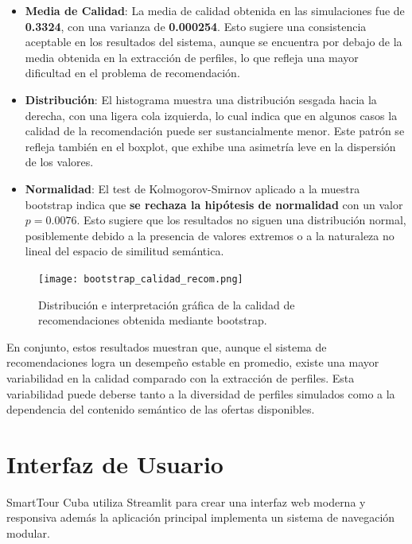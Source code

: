\documentclass[runningheads]{llncs}
\begin{document}
\begin{itemize}
    \item \textbf{Media de Calidad}: La media de calidad obtenida en las simulaciones fue de \textbf{0.3324}, con una varianza de \textbf{0.000254}. Esto sugiere una consistencia aceptable en los resultados del sistema, aunque se encuentra por debajo de la media obtenida en la extracción de perfiles, lo que refleja una mayor dificultad en el problema de recomendación.
    
    \item \textbf{Distribución}: El histograma muestra una distribución sesgada hacia la derecha, con una ligera cola izquierda, lo cual indica que en algunos casos la calidad de la recomendación puede ser sustancialmente menor. Este patrón se refleja también en el boxplot, que exhibe una asimetría leve en la dispersión de los valores.
    
    \item \textbf{Normalidad}: El test de Kolmogorov-Smirnov aplicado a la muestra bootstrap indica que \textbf{se rechaza la hipótesis de normalidad} con un valor $p = 0.0076$. Esto sugiere que los resultados no siguen una distribución normal, posiblemente debido a la presencia de valores extremos o a la naturaleza no lineal del espacio de similitud semántica.

\end{itemize}

\begin{figure}[H]
    \centering
    \texttt{[image: bootstrap\_calidad\_recom.png]}
    \caption{Distribución e interpretación gráfica de la calidad de recomendaciones obtenida mediante bootstrap.}
    \label{fig:bootstrap-recomendaciones}
\end{figure}

En conjunto, estos resultados muestran que, aunque el sistema de recomendaciones logra un desempeño estable en promedio, existe una mayor variabilidad en la calidad comparado con la extracción de perfiles. Esta variabilidad puede deberse tanto a la diversidad de perfiles simulados como a la dependencia del contenido semántico de las ofertas disponibles.


\section{Interfaz de Usuario}


SmartTour Cuba utiliza Streamlit para crear una interfaz web moderna y responsiva además la aplicación principal implementa un sistema de navegación modular.
\end{document}
